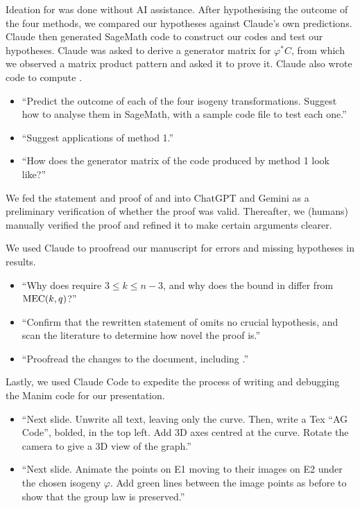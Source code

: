 \documentclass[twocolumn, 11pt]{scrartcl}
\begin{document}
Ideation for  was done without AI assistance. After hypothesising the outcome of the four methods, we compared our hypotheses against Claude's own predictions. Claude then generated SageMath code \cite{code-experiments} to construct our codes and test our hypotheses. Claude was asked to derive a generator matrix for $\varphi^*C$, from which we observed a matrix product pattern and asked it to prove it. Claude also wrote code \cite{code-f251} to compute .
\begin{itemize}
    \item ``Predict the outcome of each of the four isogeny transformations. Suggest how to analyse them in SageMath, with a sample code file to test each one.''
    \item ``Suggest applications of method 1.''
    \item ``How does the generator matrix of the code produced by method 1 look like?''
\end{itemize}

We fed the statement and proof of  and  into ChatGPT and Gemini as a preliminary verification of whether the proof was valid. Thereafter, we (humans) manually verified the proof and refined it to make certain arguments clearer.

We used Claude to proofread our manuscript for errors and missing hypotheses in results.
\begin{itemize}
    \item ``Why does  require $3\leq k\leq n-3$, and why does the bound in \cite{zhu2026isodual} differ from $\operatorname{MEC}(k,q)$?''
    \item ``Confirm that the rewritten statement of  omits no crucial hypothesis, and scan the literature to determine how novel the proof is.''
    \item ``Proofread the changes to the document, including .''
\end{itemize}

Lastly, we used Claude Code to expedite the process of writing and debugging the Manim code for our presentation.
\begin{itemize}
    \item ``Next slide. Unwrite all text, leaving only the curve. Then, write a Tex ``AG Code'', bolded, in the top left. Add 3D axes centred at the curve. Rotate the camera to give a 3D view of the graph.''
    \item ``Next slide. Animate the points on E1 moving to their images on E2 under the chosen isogeny $\varphi$. Add green lines between the image points as before to show that the group law is preserved.''
\end{itemize}
\end{document}
